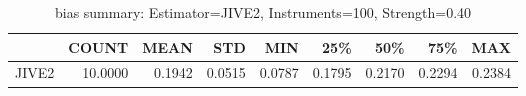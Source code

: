 \begin{table}[ht]
\centering
\caption{bias summary: Estimator=JIVE2, Instruments=100, Strength=0.40}
\begin{tabular}{lrrrrrrrr}
\toprule
 & COUNT & MEAN & STD & MIN & 25\% & 50\% & 75\% & MAX \\
\midrule
JIVE2 & 10.0000 & 0.1942 & 0.0515 & 0.0787 & 0.1795 & 0.2170 & 0.2294 & 0.2384 \\
\bottomrule
\end{tabular}
\end{table}
